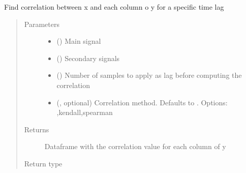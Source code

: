 \documentclass[letterpaper,10pt,english]{sphinxmanual}
\begin{document}

\begin{fulllineitems}
\label{\detokenize{correlator:correlator.lagged_corr}}
\sphinxAtStartPar
Find correlation between x and each column o y for a specific time lag
\begin{quote}\begin{description}
\item[{Parameters}] \leavevmode\begin{itemize}
\item {} 
\sphinxAtStartPar
{} () \textendash{} Main signal

\item {} 
\sphinxAtStartPar
{} () \textendash{} Secondary signals

\item {} 
\sphinxAtStartPar
{} () \textendash{} Number of samples to apply as lag before computing the correlation

\item {} 
\sphinxAtStartPar
{} (, optional) \textendash{} Correlation method. Defaults to . Options: ,\textasciigrave{}kendall\textasciigrave{},\textasciigrave{}spearman\textasciigrave{}

\end{itemize}

\item[{Returns}] \leavevmode
\sphinxAtStartPar
Dataframe with the correlation value for each column of y

\item[{Return type}] \leavevmode
\sphinxAtStartPar
{}

\end{description}\end{quote}

\end{fulllineitems}
\end{document}
